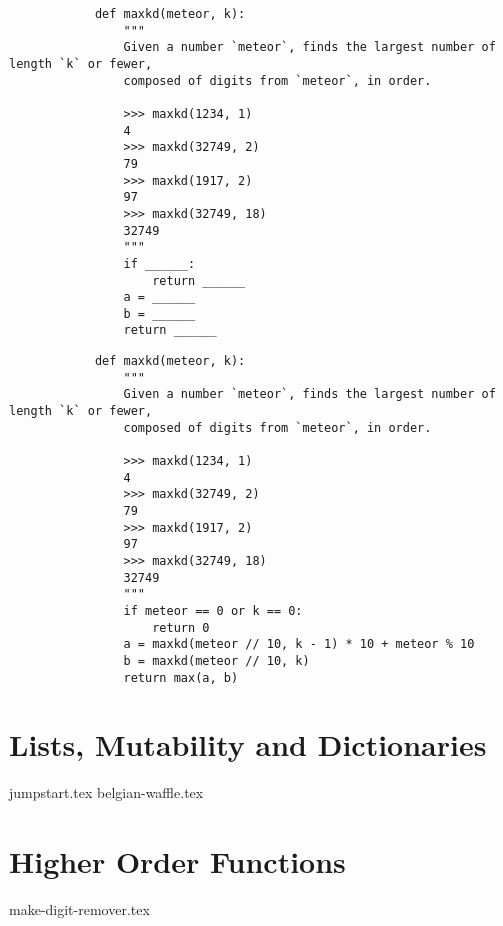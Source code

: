 \documentclass{exam}
\begin{document}
    \begin{blocksection}
        \begin{lstlisting}
            def maxkd(meteor, k):
                """
                Given a number `meteor`, finds the largest number of length `k` or fewer,
                composed of digits from `meteor`, in order.
            
                >>> maxkd(1234, 1)
                4
                >>> maxkd(32749, 2)
                79
                >>> maxkd(1917, 2)
                97
                >>> maxkd(32749, 18)
                32749
                """
                if ______:
                    return ______
                a = ______
                b = ______
                return ______
        \end{lstlisting}
    \end{blocksection}
    \begin{solution}
        \begin{lstlisting}
            def maxkd(meteor, k):
                """
                Given a number `meteor`, finds the largest number of length `k` or fewer,
                composed of digits from `meteor`, in order.

                >>> maxkd(1234, 1)
                4
                >>> maxkd(32749, 2)
                79
                >>> maxkd(1917, 2)
                97
                >>> maxkd(32749, 18)
                32749
                """
                if meteor == 0 or k == 0:
                    return 0
                a = maxkd(meteor // 10, k - 1) * 10 + meteor % 10
                b = maxkd(meteor // 10, k)
                return max(a, b)
        \end{lstlisting}
    \end{solution}
\section{Lists, Mutability and Dictionaries}
\begin{questions}
    {jumpstart.tex}
    {belgian-waffle.tex}
\end{questions}

\section{Higher Order Functions}
\begin{questions}
    {make-digit-remover.tex}
\end{questions}
\end{document}
